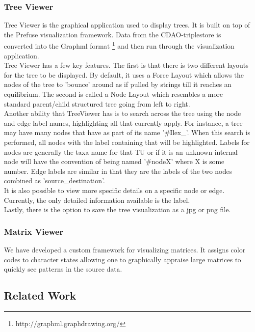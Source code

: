 \documentclass[10pt]{bmc_article}
\newenvironment{bmcformat}{\begin{raggedright}\baselineskip20pt\sloppy\setboolean{publ}{false}}{\end{raggedright}\baselineskip20pt\sloppy}
\begin{document}
\begin{bmcformat}
\subsubsection*{Tree Viewer}
Tree Viewer is the graphical application used to display trees.  It is built on top of the Prefuse visualization framework. Data from the CDAO-triplestore is converted into the Graphml format \footnote{http://graphml.graphdrawing.org/} and then run through the visualization application.
\\
Tree Viewer has a few key features.  The first is that there is two different layouts for the tree to be displayed.  By default, it uses a Force Layout which allows the nodes of the tree to 'bounce' around as if pulled by strings till it reaches an equilibrium.  The second is called a Node Layout which resembles a more standard parent/child structured tree going from left to right.
\\
Another ability that TreeViewer has is to search across the tree using the node and edge label names, highlighting all that currently apply.  For instance, a tree may have many nodes that have as part of its name '\#Ilex\_'.  When this search is performed, all nodes with the label containing that will be highlighted.  Labels for nodes are generally the taxa name for that TU or if it is an unknown internal node will have the convention of being named '\#nodeX' where X is some number.  Edge labels are similar in that they are the labels of the two nodes combined as 'source\_destination'.
\\
It is also possible to view more specific details on a specific node or edge.  Currently, the only detailed information available is the label.  \\
Lastly, there is the option to save the tree visualization as a jpg or png file.
\subsubsection*{Matrix Viewer}
 We have developed  a custom framework for visualizing matrices. It assigns color codes to character states allowing one to graphically appraise large matrices to quickly see patterns in the source data.
  
\subsection*{Related Work}

\end{bmcformat}
\end{document}

